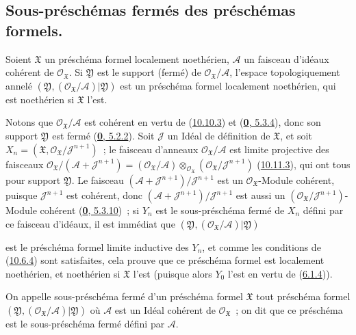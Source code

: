 \subsection{Sous-préschémas fermés des préschémas formels.}
\label{subsection:I.10.14-fr}

\begin{proposition}[10.14.1]
\label{I.10.14.1-fr}
Soient $\mathfrak{X}$ un préschéma formel localement noethérien,
$\mathscr{A}$ un faisceau d'idéaux cohérent de
$\mathscr{O}_{\mathfrak{X}}$. Si $\mathfrak{Y}$ est le support (fermé) de
$\mathscr{O}_{\mathfrak{X}}/\mathscr{A}$, l'espace topologiquement annelé
$(\mathfrak{Y},(\mathscr{O}_{\mathfrak{X}}/\mathscr{A})|\mathfrak{Y})$ est
un préschéma formel localement noethérien, qui est noethérien si
$\mathfrak{X}$ l'est.
\end{proposition}

Notons que $\mathscr{O}_{\mathfrak{X}}/\mathscr{A}$ est cohérent en vertu de
(\hyperref[I.10.10.3-fr]{10.10.3}) et
(\hyperref[0.5.3.4-fr]{\textbf{0}, 5.3.4}), donc son support $\mathfrak{Y}$ est fermé
(\hyperref[0.5.2.2-fr]{\textbf{0}, 5.2.2}). Soit $\mathscr{J}$ un Idéal de définition
de $\mathfrak{X}$, et soit
$X_n=(\mathfrak{X},\mathscr{O}_{\mathfrak{X}}/\mathscr{J}^{n+1})$~; le
faisceau d'anneaux $\mathscr{O}_{\mathfrak{X}}/\mathscr{A}$ est limite
projective des faisceaux
$\mathscr{O}_{\mathfrak{X}}/(\mathscr{A}+\mathscr{J}^{n+1})
=(\mathscr{O}_{\mathfrak{X}}/\mathscr{A})
\otimes_{\mathscr{O}_{\mathfrak{X}}}
(\mathscr{O}_{\mathfrak{X}}/\mathscr{J}^{n+1})$
(\hyperref[I.10.11.3-fr]{10.11.3}), qui ont tous pour support
$\mathfrak{Y}$. Le faisceau
$(\mathscr{A}+\mathscr{J}^{n+1})/\mathscr{J}^{n+1}$ est un
$\mathscr{O}_{\mathfrak{X}}$-Module cohérent, puisque
$\mathscr{J}^{n+1}$ est cohérent, donc
$(\mathscr{A}+\mathscr{J}^{n+1})/\mathscr{J}^{n+1}$ est aussi un
$(\mathscr{O}_{\mathfrak{X}}/\mathscr{J}^{n+1})$-Module cohérent
(\hyperref[0.5.3.10-fr]{\textbf{0}, 5.3.10})~; si $Y_n$ est le sous-préschéma fermé
de $X_n$ défini par ce faisceau d'idéaux, il est immédiat que
$(\mathfrak{Y},(\mathscr{O}_{\mathfrak{X}}/\mathscr{A})|\mathfrak{Y})$

est le préschéma formel limite inductive des $Y_n$, et comme les conditions de
(\hyperref[I.10.6.4-fr]{10.6.4}) sont satisfaites, cela prouve que ce préschéma
formel est localement noethérien, et noethérien si $\mathfrak{X}$ l'est (puisque
alors $Y_0$ l'est en vertu de (\hyperref[I.6.1.4-fr]{6.1.4})).

\begin{definition}[10.14.2]
\label{I.10.14.2-fr}
On appelle sous-préschéma fermé d'un préschéma formel $\mathfrak{X}$ tout
préschéma formel
$(\mathfrak{Y},(\mathscr{O}_{\mathfrak{X}}/\mathscr{A})|\mathfrak{Y})$ où
$\mathscr{A}$ est un Idéal cohérent de $\mathscr{O}_{\mathfrak{X}}$~; on dit que ce
préschéma est le sous-préschéma fermé défini par $\mathscr{A}$.
\end{definition}

